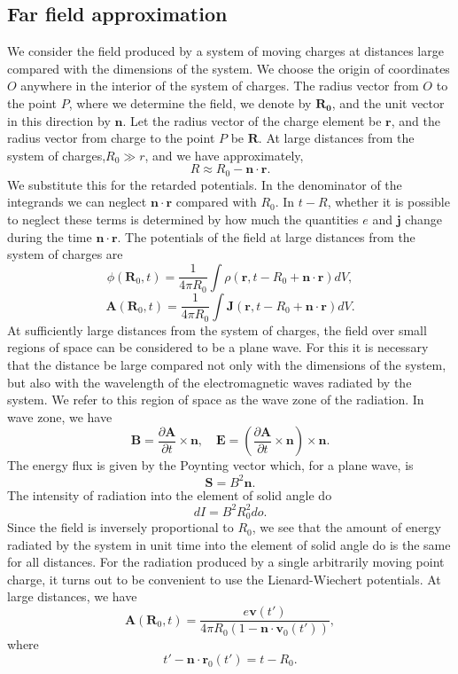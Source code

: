 \subsection{Far field approximation}
We consider the field produced by a system of moving charges at distances large compared with the dimensions of the system. We choose the origin of coordinates $O$ anywhere in the interior of the system of charges. The radius vector from $O$ to the point $P$, where we determine the field, we denote by $\bm{R_0}$, and the unit vector in this direction by $\bm{n}$. Let the radius vector of the charge element be $\bm{r}$, and the radius vector from charge to the point $P$ be $\bm{R}$. At large distances from the system of charges,$R_0 \gg r$, and we have approximately,
\[R \approx R_0 - \bm{n}\cdot\bm{r}.\]
We substitute this for the retarded potentials. In the denominator of the integrands we can neglect $\bm{n}\cdot\bm{r}$ compared with $R_0$. In $t-R$, whether it is possible to neglect these terms is determined by how much the quantities $e$ and $\bm{j}$ change during the time $\bm{n}\cdot\bm{r}$. The potentials of the field at large distances from the system of charges are
\[\phi(\bm{R}_0,t) = \frac{1}{4\pi R_0} \int \rho(\bm{r},t-R_0+\bm{n}\cdot\bm{r}) dV,\]
\[\bm{A}(\bm{R}_0,t) = \frac{1}{4\pi R_0} \int \bm{J}(\bm{r},t-R_0+\bm{n}\cdot\bm{r}) dV.\]
At sufficiently large distances from the system of charges, the field over small regions of space can be considered to be a plane wave. 
For this it is necessary that the distance be large
compared not only with the dimensions of the system, but also with the wavelength of the electromagnetic waves radiated by the system. 
We refer to this region of space as the wave
zone of the radiation.
In wave zone, we have
\[\bm{B} = \frac{\partial \bm{A}}{\partial t} \times \bm{n} , \quad \bm{E} = \left(\frac{\partial \bm{A}}{\partial t} \times \bm{n}\right) \times \bm{n}.\]
The energy flux is given by the Poynting vector which, for a plane wave, is
\[\bm{S} = B^2\bm{n}.\]
The intensity of radiation into the element of solid angle do
\[dI = B^2R_0^2 do.\]
Since the field is inversely proportional to $R_0$, we see that the amount of energy radiated by the system in unit time into the element of solid angle do is the same for all distances.
For the radiation produced by a single arbitrarily moving point charge, it turns out to be convenient to use the Lienard-Wiechert potentials. At large distances, we have
\[\bm{A}(\bm{R}_0,t) = \frac{e\bm{v}(t')}{4\pi R_0 (1 - \bm{n}\cdot\bm{v}_0(t'))},\]
where
\[ t'-\bm{n}\cdot\bm{r}_0(t') = t - R_0.\]
